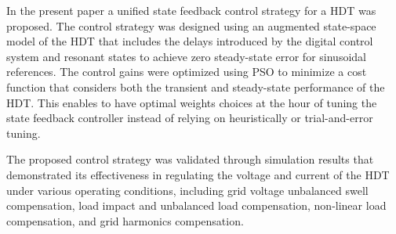 In the present paper a unified state feedback control strategy for a HDT was proposed. The control strategy was designed using an augmented state-space model of the HDT that includes the delays introduced by the digital control system and resonant states to achieve zero steady-state error for sinusoidal references. The control gains were optimized using PSO to minimize a cost function that considers both the transient and steady-state performance of the HDT. This enables to have optimal weights choices at the hour of tuning the state feedback controller instead of relying on heuristically or trial-and-error tuning.

The proposed control strategy was validated through simulation results that demonstrated its effectiveness in regulating the voltage and current of the HDT under various operating conditions, including grid voltage unbalanced swell compensation, load impact and unbalanced load compensation, non-linear load compensation, and grid harmonics compensation.